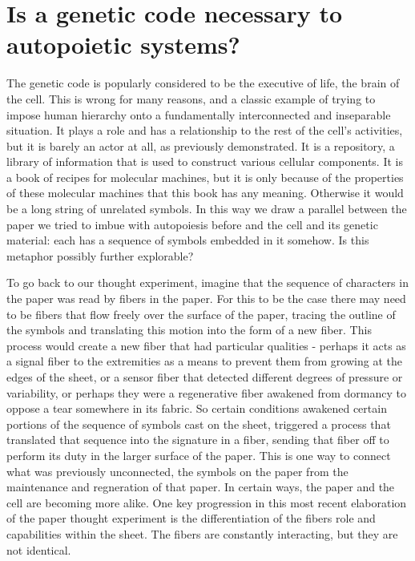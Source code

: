 \documentclass[12pt]{scrartcl}
\begin{document}
\section{Is a genetic code necessary to autopoietic systems?}

The genetic code is popularly considered to be the executive of life, the brain of the cell.  This is wrong for many reasons, and a classic example of trying to impose human hierarchy onto a fundamentally interconnected and inseparable situation.  It plays a role and has a relationship to the rest of the cell's activities, but it is barely an actor at all, as previously demonstrated.  It is a repository, a library of information that is used to construct various cellular components.  It is a book of recipes for molecular machines, but it is only because of the properties of these molecular machines that this book has any meaning.  Otherwise it would be a long string of unrelated symbols.  In this way we draw a parallel between the paper we tried to imbue with autopoiesis before and the cell and its genetic material: each has a sequence of symbols embedded in it somehow.  Is this metaphor possibly further explorable? 

To go back to our thought experiment, imagine that the sequence of characters in the paper was read by fibers in the paper.  For this to be the case there may need to be fibers that flow freely over the surface of the paper, tracing the outline of the symbols and translating this motion into the form of a new fiber.  This process would create a new fiber that had particular qualities - perhaps it acts as a signal fiber to the extremities as a means to prevent them from growing at the edges of the sheet, or a sensor fiber that detected different degrees of pressure or variability, or perhaps they were a regenerative fiber awakened from dormancy to oppose a tear somewhere in its fabric.  So certain conditions awakened certain portions of the sequence of symbols cast on the sheet, triggered a process that translated that sequence into the signature in a fiber, sending that fiber off to perform its duty in the larger surface of the paper.  This is one way to connect what was previously unconnected, the symbols on the paper from the maintenance and regneration of that paper.  In certain ways, the paper and the cell are becoming more alike.  One key progression in this most recent elaboration of the paper thought experiment is the differentiation of the fibers role and capabilities within the sheet.  The fibers are constantly interacting, but they are not identical.  
\end{document}
